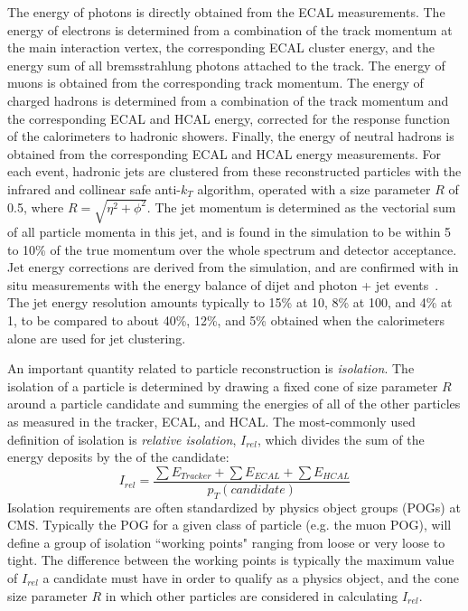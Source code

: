 The energy of photons is directly obtained from the ECAL measurements. The energy of electrons is determined from a combination of the track momentum at the main interaction vertex, the corresponding ECAL cluster energy, and the energy sum of all bremsstrahlung photons attached to the track. The energy of muons is obtained from the corresponding track momentum. The energy of charged hadrons is determined from a combination of the track momentum and the corresponding ECAL and HCAL energy, corrected for the response function of the calorimeters to hadronic showers. Finally, the energy of neutral hadrons is obtained from the corresponding ECAL and HCAL energy measurements.
For each event, hadronic jets are clustered from these reconstructed particles with the infrared and collinear safe anti-$k_T$ algorithm, operated with a size parameter $R$ of 0.5, where $R = \sqrt{\eta^2 + \phi^2}$\cite{Chatrchyan:2011ds}. The jet momentum is determined as the vectorial sum of all particle momenta in this jet, and is found in the simulation to be within 5 to 10\% of the true momentum over the whole \pt spectrum and detector acceptance. Jet energy corrections are derived from the simulation, and are confirmed with in situ measurements with the energy balance of dijet and photon + jet events~\cite{Chatrchyan:2011ds}. The jet energy resolution amounts typically to 15\% at 10\GeV, 8\% at 100\GeV, and 4\% at 1\TeV, to be compared to about 40\%, 12\%, and 5\% obtained when the calorimeters alone are used for jet clustering.

An important quantity related to particle reconstruction is \textit{isolation}. The isolation of a particle is determined by drawing a fixed cone of size parameter $R$ around a particle candidate and summing the energies of all of the other particles as measured in the tracker, ECAL, and HCAL. The most-commonly used definition of isolation is \textit{relative isolation}, $I_{rel}$, which divides the sum of the energy deposits by the \pt of the candidate:
\begin{equation} \label{eq:iso}
I_{rel} = \frac{\sum E_{Tracker} + \sum E_{ECAL} + \sum E_{HCAL}}{p_T(candidate)}
\end{equation}
\noindent Isolation requirements are often standardized by physics object groups (POGs) at CMS. Typically the POG for a given class of particle (e.g. the muon POG), will define a group of isolation ``working points" ranging from loose or very loose to tight. The difference between the working points is typically the maximum value of $I_{rel}$ a candidate must have in order to qualify as a physics object, and the cone size parameter $R$ in which other particles are considered in calculating $I_{rel}$.

